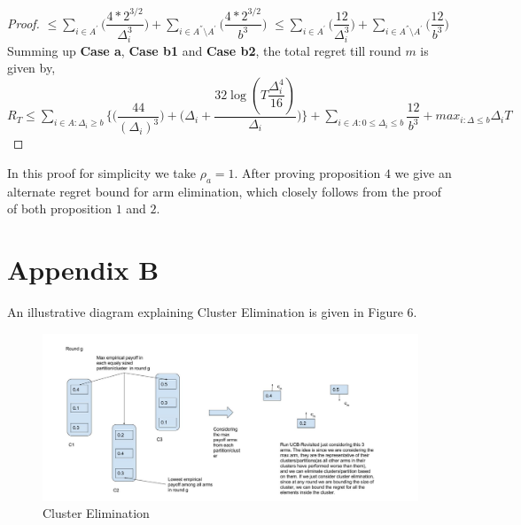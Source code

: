 \begin{proof}
\newline
\hspace*{0em}$\leq\sum_{i\in A^{'}}\bigg(\dfrac{4*2^{3/2}}{\Delta_{i}^{3}} \bigg)+\sum_{i\in A^{''}\setminus A^{'}}\bigg(\dfrac{4*2^{3/2}}{b^{3}} \bigg)$
\newline
\hspace*{0em}$\leq\sum_{i\in A^{'}}\bigg(\dfrac{12}{\Delta_{i}^{3}} \bigg)+\sum_{i\in A^{''}\setminus A^{'}}\bigg(\dfrac{12}{b^{3}} \bigg)$
\newline
Summing up \textbf{Case a}, \textbf{Case b1} and \textbf{Case b2}, the total regret till round $m$ is given by,
\newline $R_{T}\leq \sum_{i\in A:\Delta_{i}\geq b}\bigg \lbrace \bigg(\dfrac{44}{(\Delta_{i})^{3}}\bigg) + \bigg(\Delta_{i}+\dfrac{32\log{(T\dfrac{\Delta_{i}^{4}}{16})}}{\Delta_{i}}\bigg)\bigg\rbrace + \sum_{i\in A:0\leq\Delta_{i}\leq b}\dfrac{12}{b^{3}} + max_{i:\Delta\leq b}\Delta_{i}T$
\end{proof}

\begin{remark}
In this proof for simplicity we take $\rho_{a}=1$. After proving proposition $4$ we give an alternate regret bound for arm elimination, which closely follows from the proof of both proposition $1$ and $2$.  
\end{remark}


\section{Appendix B}

An illustrative diagram explaining Cluster Elimination is given in Figure 6.

\begin{figure}
\includegraphics[scale=0.3]{img/diagCluster.jpg}
\caption{Cluster Elimination}
\end{figure}


